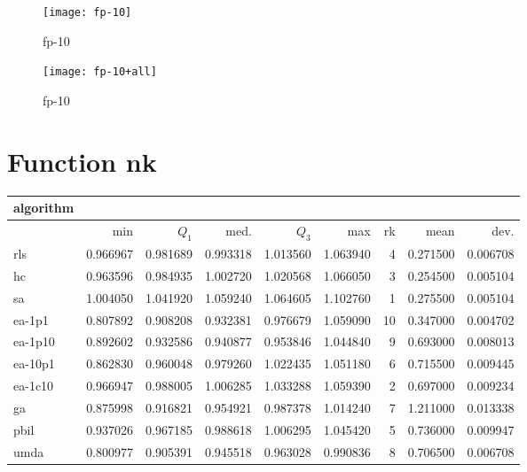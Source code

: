 \begin{center}
\begin{figure}[h]
\centering
\texttt{[image: fp-10]}
\caption{fp-10}
\end{figure}
\end{center}

\begin{center}
\begin{figure}[h]
\centering
\texttt{[image: fp-10+all]}
\caption{fp-10}
\end{figure}
\end{center}

\newpage

\section{Function nk}
\begin{center}
\begin{tabular}{@{}l*{5}{>{{}}N{1}{2}}>{{}}N{2}{0}N{1}{3}N{1}{3}@{}}
\toprule
{algorithm} &  &  \\
\midrule
& {min} & {$Q_1$} & {med.} & {$Q_3$} & {max} & {rk} & {mean} & {dev.} \\
\midrule
rls & 0.966967 & 0.981689 & 0.993318 & 1.013560 & 1.063940 & 4 & 0.271500 & 0.006708 \\
 hc & 0.963596 & 0.984935 & 1.002720 & 1.020568 & 1.066050 & 3 & 0.254500 & 0.005104 \\
 sa & {\color{blue}} 1.004050 & {\color{blue}} 1.041920 & {\color{blue}} 1.059240 & {\color{blue}} 1.064605 & {\color{blue}} 1.102760 & 1 & 0.275500 & 0.005104 \\
 ea-1p1 & 0.807892 & 0.908208 & 0.932381 & 0.976679 & 1.059090 & 10 & 0.347000 & 0.004702 \\
 ea-1p10 & 0.892602 & 0.932586 & 0.940877 & 0.953846 & 1.044840 & 9 & 0.693000 & 0.008013 \\
 ea-10p1 & 0.862830 & 0.960048 & 0.979260 & 1.022435 & 1.051180 & 6 & 0.715500 & 0.009445 \\
 ea-1c10 & 0.966947 & 0.988005 & 1.006285 & 1.033288 & 1.059390 & 2 & 0.697000 & 0.009234 \\
 ga & 0.875998 & 0.916821 & 0.954921 & 0.987378 & 1.014240 & 7 & 1.211000 & 0.013338 \\
 pbil & 0.937026 & 0.967185 & 0.988618 & 1.006295 & 1.045420 & 5 & 0.736000 & 0.009947 \\
 umda & 0.800977 & 0.905391 & 0.945518 & 0.963028 & 0.990836 & 8 & 0.706500 & 0.006708 \\
 \bottomrule
\end{tabular}
\end{center}

